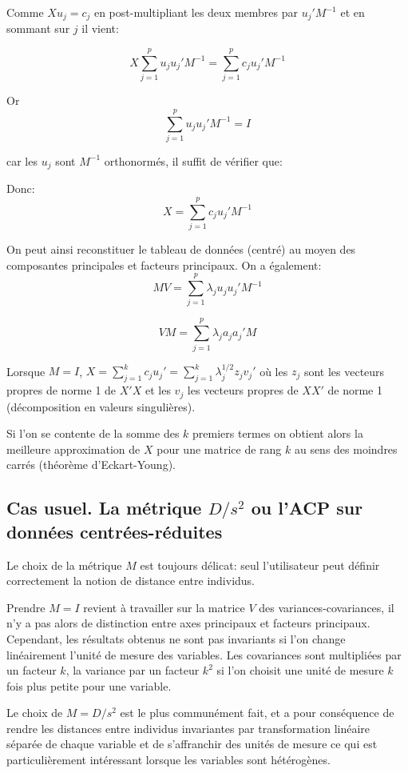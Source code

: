 \documentclass[12pt,a4paper]{article}
\begin{document}
Comme $X u_j = c_j$ en post-multipliant les deux membres par $u_j' M^{-1}$ et en sommant sur $j$
il vient:

\[X \sum_{j=1}^p u_j u_j' M^{-1} = \sum_{j=1}^p c_j u_j' M^{-1}\]

Or
\[\sum_{j=1}^p u_j u_j' M^{-1} = I\]

car les $u_j$ sont $M^{-1}$ orthonormés, il suffit de vérifier que:

Donc:
\[X = \sum_{j=1}^p c_j u_j' M^{-1}\]

On peut ainsi reconstituer le tableau de données (centré) au moyen des composantes principales et facteurs principaux. On a également:
\[M V = \sum_{j=1}^p \lambda_j u_j u_j' M^{-1}\]

\[V M = \sum_{j=1}^p \lambda_j a_j a_j' M\]

Lorsque $M = I$, $X = \sum_{j=1}^k c_j u_j' = \sum_{j=1}^k \lambda_j^{1/2} z_j v_j'$ où les $z_j$ sont les vecteurs propres de norme 1 de $X' X$ et les $v_j$ les vecteurs propres de $X X'$ de norme 1 (décomposition en valeurs singulières).

Si l'on se contente de la somme des $k$ premiers termes on obtient alors la meilleure
approximation de $X$ pour une matrice de rang $k$ au sens des moindres carrés (théorème
d'Eckart-Young).

\subsection{Cas usuel. La métrique $D/s^2$ ou l'ACP sur données centrées-réduites}

Le choix de la métrique $M$ est toujours délicat: seul l'utilisateur peut définir correctement
la notion de distance entre individus.

Prendre $M = I$ revient à travailler sur la matrice $V$ des variances-covariances, il n'y a pas
alors de distinction entre axes principaux et facteurs principaux. Cependant, les résultats obtenus ne sont pas invariants si l'on change linéairement l'unité de mesure des variables.
Les covariances sont multipliées par un facteur $k$, la variance par un facteur $k^2$ si l'on choisit une unité de mesure $k$ fois plus petite pour une variable.

Le choix de $M = D/s^2$ est le plus communément fait, et a pour conséquence de rendre les
distances entre individus invariantes par transformation linéaire séparée de chaque variable
et de s'affranchir des unités de mesure ce qui est particulièrement intéressant lorsque les
variables sont hétérogènes.
\end{document}
